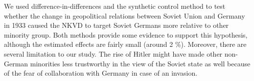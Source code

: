 We used difference-in-differences and the synthetic control method to test whether the change in geopolitical relations between Soviet Union and Germany in 1933 caused the NKVD to target Soviet Germans more relative to other minority group. Both methods provide some evidence to support this hypothesis, although the estimated effects are fairly small (around 2 \%). Moreover, there are several limitation to our study. The rise of Hitler might have made other non-German minorities less trustworthy in the view of the Soviet state as well because of the fear of collaboration with Germany in case of an invasion.
